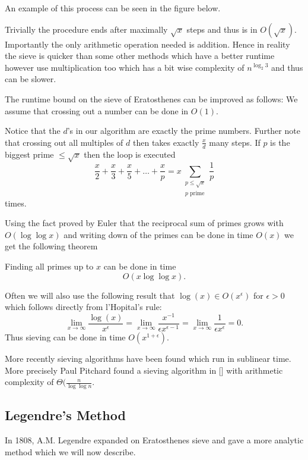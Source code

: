  \begin{eg}
	An example of this process can be seen in the figure below.
\end{eg}

Trivially the procedure ends after maximally $\sqrt{x}$ steps and thus is in $O(\sqrt{x})$.
Importantly the only arithmetic operation needed is addition.
Hence in reality the sieve is quicker than some other methods which have a better
runtime however use multiplication too which has a bit wise complexity of $n^{\log_{2} 3}$ and thus can be slower.

The runtime bound on the sieve of Eratosthenes can be improved as follows:
We assume that crossing out a number can be done in $O(1)$.

Notice that the $d$'s in our algorithm are exactly the prime numbers. Further note 
that crossing out all multiples of $d$ then takes exactly $\frac{x}{d}$ many steps. If $p$ is 
the biggest prime $\leq \sqrt{x} $ then the loop is executed
\[
	\frac{x}{2} + \frac{x}{3} + \frac{x}{5} + \ldots + \frac{x}{p} = x \sum_{\substack{p \leq \sqrt{x}\\ p \text{ prime}}} \frac{1}{p}
\] 
times.

Using the fact proved by Euler that the reciprocal sum of primes grows with $O(\log \log x)$ and 
writing down of the primes can be done in time $O(x)$ we get the following theorem
 \begin{theorem}
	Finding all primes up to $x$ can be done in time
	\[
		O(x \log \log x)
	.\] 
\end{theorem}

Often we will also use the following result that 
$\log(x) \in O(x^{\epsilon})$ for $\epsilon > 0$ which follows directly from l'Hopital's rule:
\[
	\lim_{x \to \infty} \frac{\log(x)}{x^{\epsilon}} = \lim_{x \to \infty} \frac{x^{-1}}{\epsilon x^{\epsilon - 1}} = \lim_{x \to \infty} \frac{1}{\epsilon x^{\epsilon}} = 0
.\] 
Thus sieving can be done in time $O(x^{1+\epsilon})$.

More recently sieving algorithms have been found which run in sublinear time. More precisely Paul Pitchard found a sieving algorithm in [] with arithmetic complexity of
$\Theta(\frac{n}{\log\log n}$.

\subsection{Legendre's Method}
In 1808, A.M. Legendre expanded on Eratosthenes sieve and gave a more analytic method which we will now describe.


